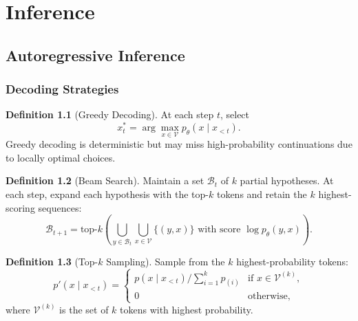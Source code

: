 \documentclass[11pt,a4paper]{book}
\theoremstyle{definition}
\newtheorem{definition}{Definition}[chapter]
\begin{document}
\part{Inference}

\chapter{Autoregressive Inference}
\label{ch:inference}

\section{Decoding Strategies}

\begin{definition}[Greedy Decoding]
	At each step $t$, select
	\begin{equation}
		x_t^* = \arg\max_{x \in \mathcal{V}} p_\theta(x \mid x_{<t}).
	\end{equation}
	Greedy decoding is deterministic but may miss high-probability continuations due to locally optimal choices.
\end{definition}

\begin{definition}[Beam Search]
	Maintain a set $\mathcal{B}_t$ of $k$ partial hypotheses. At each step, expand each hypothesis with the top-$k$ tokens and retain the $k$ highest-scoring sequences:
	\begin{equation}
		\mathcal{B}_{t+1} = \text{top-}k \left( \bigcup_{y \in \mathcal{B}_t} \bigcup_{x \in \mathcal{V}} \{(y, x)\} \text{ with score } \log p_\theta(y, x) \right).
	\end{equation}
\end{definition}

\begin{definition}[Top-$k$ Sampling]
	Sample from the $k$ highest-probability tokens:
	\begin{equation}
		p'(x \mid x_{<t}) = \begin{cases}
			p(x \mid x_{<t}) / \sum_{i=1}^k p_{(i)} & \text{if } x \in \mathcal{V}^{(k)}, \\
			0                                       & \text{otherwise},
		\end{cases}
	\end{equation}
	where $\mathcal{V}^{(k)}$ is the set of $k$ tokens with highest probability.
\end{definition}
\end{document}
